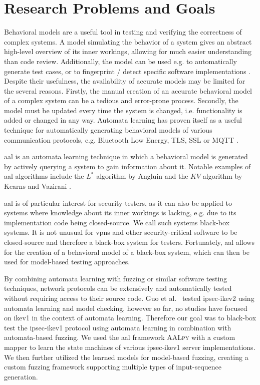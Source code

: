 \section{Research Problems and Goals}
Behavioral models are a useful tool in testing and verifying the correctness of complex systems. A model simulating the behavior of a system gives an abstract high-level overview of its inner workings, allowing for much easier understanding than code review. Additionally, the model can be used e.g. to automatically generate test cases, or to fingerprint / detect specific software implementations \cite{pferscher2021fingerprinting, pferscher2022fuzzing}. Despite their usefulness, the availability of accurate models may be limited for the several reasons. Firstly, the manual creation of an accurate behavioral model of a complex system can be a tedious and error-prone process. Secondly, the model must be updated every time the system is changed, i.e. functionality is added or changed in any way. Automata learning has proven itself as a useful technique for automatically generating behavioral models of various communication protocols, e.g. Bluetooth Low Energy, TLS, SSL or MQTT . 

\Ac{aal} is an automata learning technique in which a behavioral model is generated by actively querying a system to gain information about it. Notable examples of \ac{aal} algorithms include the $L^*$ algorithm by Angluin \cite{angluin1987learning} and the $KV$ algorithm by Kearns and Vazirani \cite{KV1994}.

\Ac{aal} is of particular interest for security testers, as it can also be applied to systems where knowledge about its inner workings is lacking, e.g. due to its implementation code being closed-source. We call such systems black-box systems. It is not unusual for \acp{vpn} and other security-critical software to be closed-source and therefore a black-box system for testers. Fortunately, \ac{aal} allows for the creation of a behavioral model of a black-box system, which can then be used for model-based testing approaches.

By combining automata learning with fuzzing or similar software testing techniques, network protocols can be extensively and automatically tested without requiring access to their source code. Guo et al.~\cite{guo2019model} tested \ac{ipsec}-\ac{ike}v2 using automata learning and model checking, however so far, no studies have focused on \ac{ike}v1 in the context of automata learning. Therefore our goal was to black-box test the \ac{ipsec}-\ac{ike}v1 protocol using automata learning in combination with automata-based fuzzing. We used the \ac{aal} framework \textsc{AALpy} \cite{muvskardin2022aalpy} with a custom mapper to learn the state machines of various \ac{ipsec}-\ac{ike}v1 server implementations. We then further utilized the learned models for model-based fuzzing, creating a custom fuzzing framework supporting multiple types of input-sequence generation. %


